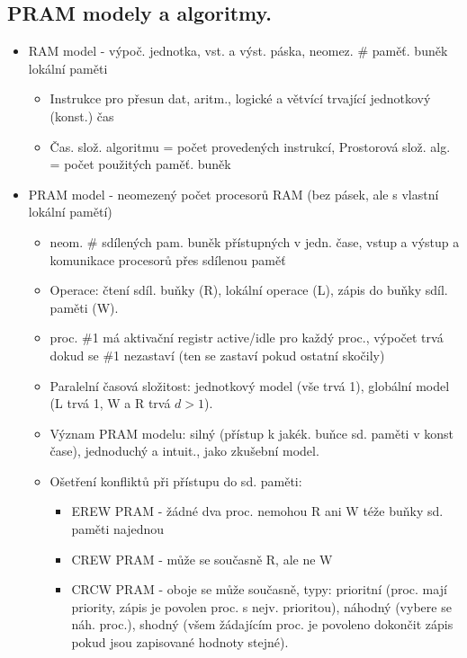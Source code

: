 \documentclass[a4paper,hidelinks]{article}
\begin{document}
\subsection{PRAM modely a algoritmy.}

\begin{itemize}
    \item RAM model - výpoč. jednotka, vst. a výst. páska, neomez. \# paměť. buněk lokální paměti
    \begin{itemize}
        \item Instrukce pro přesun dat, aritm., logické a větvící trvající jednotkový (konst.) čas
        \item Čas. slož. algoritmu = počet provedených instrukcí, Prostorová slož. alg. = počet použitých paměť. buněk
    \end{itemize}
    \item PRAM model - neomezený počet procesorů RAM (bez pásek, ale s vlastní lokální pamětí)
    \begin{itemize}
        \item neom. \# sdílených pam. buněk přístupných v jedn. čase, vstup a výstup a komunikace procesorů přes sdílenou paměť
        \item Operace: čtení sdíl. buňky (R), lokální operace (L), zápis do buňky sdíl. paměti (W).
        \item proc. \#1 má aktivační registr active/idle pro každý proc., výpočet trvá dokud se \#1 nezastaví (ten se zastaví pokud ostatní skočily)
        \item Paralelní časová složitost: jednotkový model (vše trvá 1), globální model (L trvá 1, W a R trvá $d>1$).
        \item Význam PRAM modelu: silný (přístup k jakék. buňce sd. paměti v konst čase), jednoduchý a intuit., jako zkušební model.
        \item Ošetření konfliktů při přístupu do sd. paměti:
        \begin{itemize}
            \item EREW PRAM - žádné dva proc. nemohou R ani W téže buňky sd. paměti najednou
            \item CREW PRAM - může se současně R, ale ne W
            \item CRCW PRAM - oboje se může současně, typy: prioritní (proc. mají priority, zápis je povolen proc. s nejv. prioritou), náhodný (vybere se náh. proc.), shodný (všem žádajícím proc. je povoleno dokončit zápis pokud jsou zapisované hodnoty stejné).
        \end{itemize}

\end{itemize}
\end{itemize}
\end{document}
